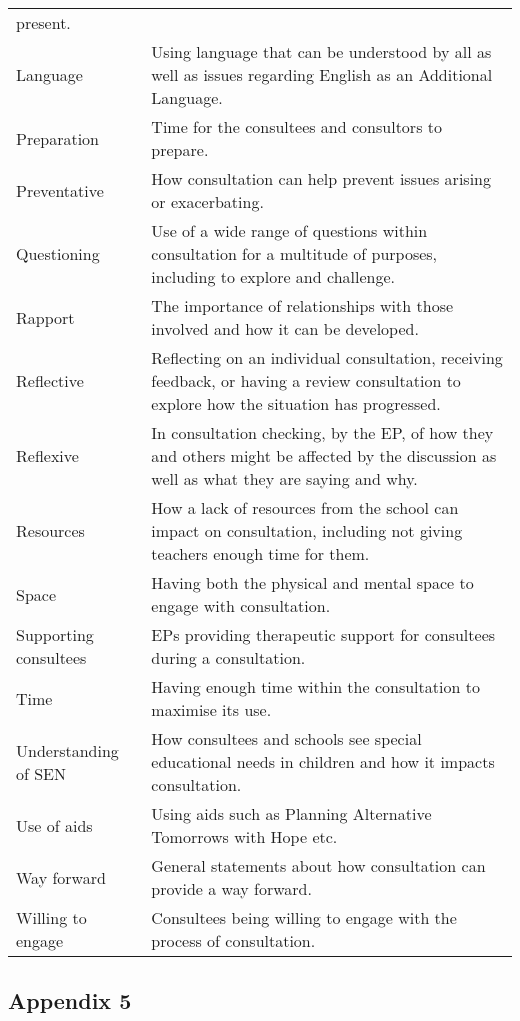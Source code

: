 \documentclass[
  english,
  man]{apa7}
\begin{document}
\begin{longtable}[]{@{}
  >{\raggedright\arraybackslash}p{}
  >{\raggedright\arraybackslash}p{}@{}}
present. \\
Language & Using language that can be understood by
all as well as issues regarding English as
an Additional Language. \\
Preparation & Time for the consultees and consultors to
prepare. \\
Preventative & How consultation can help prevent issues
arising or exacerbating. \\
Questioning & Use of a wide range of questions within
consultation for a multitude of purposes,
including to explore and challenge. \\
Rapport & The importance of relationships with those
involved and how it can be developed. \\
Reflective & Reflecting on an individual consultation,
receiving feedback, or having a review
consultation to explore how the situation
has progressed. \\
Reflexive & In consultation checking, by the EP, of how
they and others might be affected by the
discussion as well as what they are saying
and why. \\
Resources & How a lack of resources from the school can
impact on consultation, including not
giving teachers enough time for them. \\
Space & Having both the physical and mental space
to engage with consultation. \\
Supporting consultees & EPs providing therapeutic support for
consultees during a consultation. \\
Time & Having enough time within the consultation
to maximise its use. \\
Understanding of SEN & How consultees and schools see special
educational needs in children and how it
impacts consultation. \\
Use of aids & Using aids such as Planning Alternative
Tomorrows with Hope etc. \\
Way forward & General statements about how consultation
can provide a way forward. \\
Willing to engage & Consultees being willing to engage with the
process of consultation. \\
\bottomrule
\end{longtable}

\hypertarget{appendix-5}{%
\subsection{Appendix 5}\label{appendix-5}}
\end{document}
